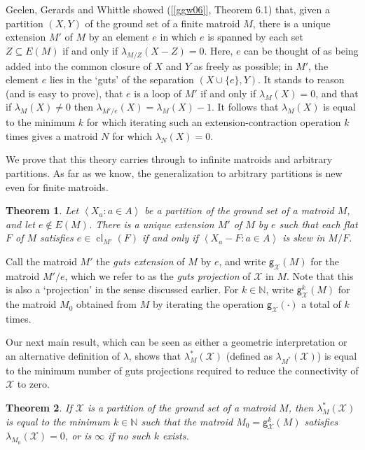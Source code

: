 \documentclass{amsart}
\theoremstyle{plain}
\newtheorem{theorem}{Theorem}[section]
\theoremstyle{definition}
\newcommand{\bN}{\mathbb N}
\newcommand{\cX}{\mathcal{X}}
\DeclareMathOperator{\cl}{cl}
\newcommand{\con}{/}
\newcommand{\ab}[1]{\left\langle#1\right\rangle}
\renewcommand{\ss}{\subseteq}
\newcommand{\gutsproj}[3]{\mathsf{g}_{#2}^{#3}(#1)}
\begin{document}
Geelen, Gerards and Whittle showed ([\ref{ggw06}], Theorem 6.1) that, 
given a partition $(X,Y)$ of the ground set of a finite matroid $M$, 
there is a unique extension $M'$ of $M$ by an element $e$ in which $e$ is spanned by each set $Z \ss E(M)$ 
if and only if $\lambda_{M \con Z}(X-Z) = 0$. 
Here, $e$ can be thought of as being added 
into the common closure of $X$ and $Y$ as freely as possible; 
in $M'$, the element $e$ lies in the `guts' of the separation $(X \cup \{e\}, Y)$. 
It stands to reason (and is easy to prove), 
that $e$ is a loop of $M'$ if and only if $\lambda_M(X) = 0$, 
and that if $\lambda_M(X) \ne 0$ then $\lambda_{M' \con e}(X) = \lambda_M(X) - 1$. 
It follows that $\lambda_M(X)$ is equal to the minimum $k$ for which iterating such an extension-contraction
operation $k$ times gives a matroid $N$ for which $\lambda_N(X) = 0$. 

We prove that this theory carries through to infinite matroids and arbitrary partitions. 
As far as we know, the generalization to arbitrary partitions is new even for finite matroids. 

\begin{theorem}\label{gutscutintro}
  Let $\ab{X_a : a \in A}$ be a partition of the ground set of a matroid $M$, and let $e \notin E(M)$. 
  There is a unique extension $M'$ of $M$ by $e$ such that each flat $F$ of $M$
  satisfies $e \in \cl_{M'}(F)$ if and only if $\ab{X_a - F : a \in A}$ is skew in $M \con F$. 
\end{theorem}

Call the matroid $M'$ the \emph{guts extension} of $M$ by $e$, and 
write $\gutsproj{M}{\cX}{}$ for the matroid $M' \con e$, 
which we refer to as the \emph{guts projection} of $\cX$ in $M$.
Note that this is also a `projection' in the sense discussed earlier. 
For $k \in \bN$, write $\gutsproj{M}{\cX}{k}$ for the matroid $M_0$ obtained from $M$ by iterating 
the operation $\gutsproj{\cdot}{\cX}{}$ a total of $k$ times. 

Our next main result, which can be seen as either a geometric interpretation or 
an alternative definition of $\lambda$, 
shows that $\lambda_M^*(\cX)$ (defined as $\lambda_{M^*}(\cX)$) 
is equal to the minimum number of guts projections required
to reduce the connectivity of $\cX$ to zero. 

\begin{theorem}\label{lambdadualeq}
  If $\cX$ is a partition of the ground set of a matroid $M$, then $\lambda_M^*(\cX)$ is equal to the minimum $k \in \bN$ 
  such that the matroid $M_0 = \gutsproj{M}{\cX}{k}$ satisfies $\lambda_{M_0}(\cX) = 0$, 
  or is $\infty$ if no such $k$ exists. 
\end{theorem}
\end{document}
